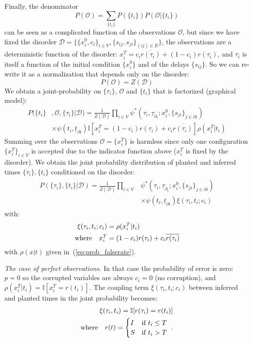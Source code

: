 \documentclass[a4paper, amsfonts, amssymb, amsmath, reprint, showkeys, nofootinbib, twoside, floatfix, pre,superscriptaddress]{revtex4-2}
\begin{document}
Finally, the denominator $$P(\mathcal{O})=\sum_{\{t_i\}}P(\{t_i\})P(\mathcal{O}|\{t_i\})$$ can be seen as a complicated function of the observations $\mathcal{O}$, but since we have fixed the disorder $\mathcal{D}=\{\{x_i^0, c_i\}_{i\in V}, \{s_{ij},s_{ji}\}_{(ij)\in E}\}$, the observations are a deterministic function of the disorder:
$x_i^T=c_i\overline{r(\tau_i)}+(1-c_i)r(\tau_i)$, and $\tau_i$ is itself a function of the initial condition $\{x_i^0\}$ and of the delays $\{s_{ij}\}$. So we can re-write it as a normalization that depends only on the disorder:
$$
	P(\mathcal{O})=Z(\mathcal{D})
$$
We obtain a joint-probability on $\{\tau_i\}$, $\mathcal{O}$ and $\{t_i\}$ that is factorized (graphical model):
\begin{align*}
	P(\{t_i\}&,\mathcal{O},\{\tau_i\}|\mathcal{D}) = \frac{1}{Z(\mathcal{D})}\prod_{i\in V}\psi^*(\tau_i, \underline{\tau}_{\partial_i};x_i^0,\{s_{ji}\}_{j\in\partial i}) \\
	&\times \psi(t_i,\underline{t}_{\partial i})\mathbb{I}[x_i^T=(1-c_i)r(\tau_i)+c_i\overline{r(\tau_i)}] \rho(x_i^T|t_i)
\end{align*}
Summing over the observations $\mathcal{O}=\{x_i^T\}$ is harmless since only one configuration $\{x_i^T\}_{i\in V}$ is accepted due to the indicator function above ($x_i^T$ is fixed by the disorder).
We obtain the joint probability distribution of planted and inferred times $\{\tau_i\}, \{t_i\}$ conditioned on the disorder:
\begin{align}
\label{eq:joint_disorder}
\begin{aligned}
	P(\{\tau_i\}, \{t_i\}|\mathcal{D})=\frac{1}{Z(\mathcal{D})}\prod_{i\in V}&\psi^*(\tau_i, \underline{\tau}_{\partial_i};x_i^0,\{s_{ji}\}_{j\in\partial i}) \\
&\times \psi(t_i,\underline{t}_{\partial i})\xi(\tau_i, t_i;c_i)
\end{aligned}
\end{align}
with:
\begin{align}
\begin{aligned}
	\xi(\tau_i, t_i;c_i) &= \rho(x_i^T|t_i) \\
	{\rm where} \quad x_i^T&=(1-c_i)r(\tau_i)+c_i\overline{r(\tau_i)}
\end{aligned}
\end{align}
with $\rho(x|t)$ given in~(\ref{eq:prob_falserate}).

{\it The case of perfect observations.}
In that case the probability of error is zero: $p=0$ so the corrupted variables are always $c_i=0$ (no corruption), and $\rho(x_i^T|t_i)=\mathbb{I}[x_i^T=r(t_i)]$. The coupling term $\xi(\tau_i, t_i;c_i)$ between inferred and planted times in the joint probability becomes:
\begin{align*}
	\xi(\tau_i, t_i)=\mathbb{I}[r(\tau_i)=r(t_i)] \\
	{\rm where} \quad r(t)=\begin{cases}
	I & \text{if $t_i\leq T$}\\
	S & \text{if $t_i>T$}
	\end{cases} \ .
\end{align*}
\end{document}
